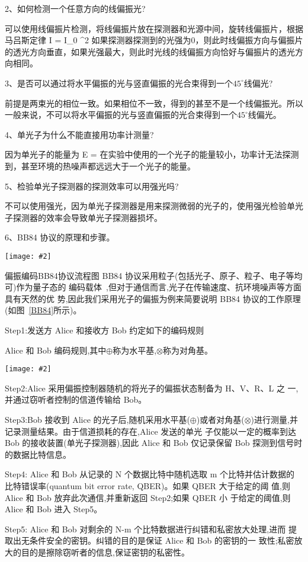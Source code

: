 \documentclass[11pt,a4paper]{ctexart}
\newcommand{\cpic}[2]{
\begin{center}
\texttt{[image: \#2]}
\end{center}
}
\begin{document}
2、如何检测一个任意方向的线偏振光?

可以使用线偏振片检测，将线偏振片放在探测器和光源中间，旋转线偏振片，根据马吕斯定律
\beq
I = I_0 \cos^2\theta
\eeq
如果探测器探测到的光强为0，则此时线偏振方向与偏振片的透光方向垂直，如果光强最大，则此时光线的线偏振方向恰好与偏振片的透光方向相同。

3、是否可以通过将水平偏振的光与竖直偏振的光合束得到一个$45^{\circ}$线偏光?

前提是两束光的相位一致。如果相位不一致，得到的甚至不是一个线偏振光。所以一般来说，不可以将水平偏振的光与竖直偏振的光合束得到一个$45^{\circ}$线偏光。

4、单光子为什么不能直接用功率计测量?

因为单光子的能量为
\beq
E =  \hbar \omega
\eeq
在实验中使用的一个光子的能量较小，功率计无法探测到，甚至环境的热噪声都远远大于一个光子的能量。

5、检验单光子探测器的探测效率可以用强光吗?

不可以使用强光，因为单光子探测器是用来探测微弱的光子的，使用强光检验单光子探测器的效率会导致单光子探测器损坏。

6、BB84 协议的原理和步骤。

\cpic{0.3}{BB84}{偏振编码BB84协议流程图}
BB84 协议采用粒子(包括光子、原子、粒子、电子等均可)作为量子态的
编码载体~\cite{lec},但对于通信而言,光子在传输速度、抗环境噪声等方面具有天然的优
势,因此我们采用光子的偏振为例来简要说明 BB84 协议的工作原理(如图~\ref{BB84}所示)。

Step1:发送方 Alice 和接收方 Bob 约定如下的编码规则
\begin{table}[H]
  \caption{Alice 和 Bob 编码规则,其中$\oplus$称为水平基,$\otimes$称为对角基。}
  \cpic{0.3}{code}
\end{table}

Step2:Alice 采用偏振控制器随机的将光子的偏振状态制备为 H、V、R、L 之
一,并通过窃听者控制的信道传输给 Bob。

Step3:Bob 接收到 Alice 的光子后,随机采用水平基($\oplus$)或者对角基($\otimes$)进行测量,并记录测量结果。由于信道损耗的存在,Alice 发送的单光
子仅能以一定的概率到达 Bob 的接收装置(单光子探测器),因此 Alice
和 Bob 仅记录保留 Bob 探测到信号时的数据比特信息。

Step4: Alice 和 Bob 从记录的 N 个数据比特中随机选取 m 个比特并估计数据的
比特错误率(quantum bit error rate, QBER)。如果 QBER 大于给定的阈
值,则 Alice 和 Bob 放弃此次通信,并重新返回 Step2;如果 QBER 小
于给定的阈值,则 Alice 和 Bob 进入 Step5。

Step5: Alice 和 Bob 对剩余的 N-m 个比特数据进行纠错和私密放大处理,进而
提取出无条件安全的密钥。纠错的目的是保证 Alice 和 Bob 的密钥的一
致性;私密放大的目的是擦除窃听者的信息,保证密钥的私密性。
\end{document}
